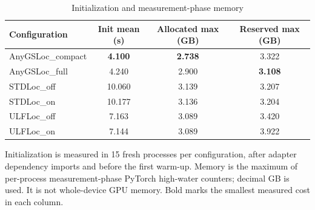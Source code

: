 \begin{table}[tp]
\centering
\footnotesize
\setlength{\tabcolsep}{4pt}
\renewcommand{\arraystretch}{1.12}
\caption{Initialization and measurement-phase memory}
\label{tab:s_resources}
\begin{tabular}{lccc}
\toprule
Configuration & Init mean (s) & Allocated max (GB) & Reserved max (GB) \\
\midrule
AnyGSLoc\_compact & \textbf{4.100} & \textbf{2.738} & 3.322 \\
AnyGSLoc\_full & 4.240 & 2.900 & \textbf{3.108} \\
STDLoc\_off & 10.060 & 3.139 & 3.207 \\
STDLoc\_on & 10.177 & 3.136 & 3.204 \\
ULFLoc\_off & 7.163 & 3.089 & 3.420 \\
ULFLoc\_on & 7.144 & 3.089 & 3.922 \\
\bottomrule
\end{tabular}
\par\smallskip\begin{minipage}{0.98\linewidth}\footnotesize Initialization is measured in 15 fresh processes per configuration, after adapter dependency imports and before the first warm-up. Memory is the maximum of per-process measurement-phase PyTorch high-water counters; decimal GB is used. It is not whole-device GPU memory. Bold marks the smallest measured cost in each column.\end{minipage}
\end{table}
